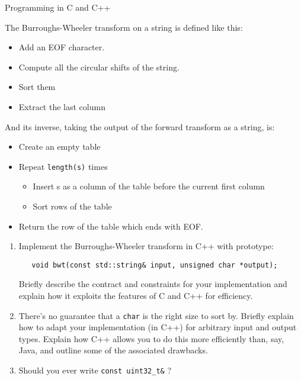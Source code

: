 \documentclass{tripos}
\begin{document}
\begin{question}[MockIB,year=2025,paper=2,question=6,author=rrw]{Programming in C and C++}

  The Burroughs-Wheeler transform on a string is defined like this:

  \begin{itemize}
    \item Add an EOF character.
    \item Compute all the circular shifts of the string.
    \item Sort them
    \item Extract the last column
  \end{itemize}

  And its inverse, taking the output of the forward transform as a string, is:

  \begin{itemize}
  \item Create an empty table
  \item Repeat \verb|length(s)| times
    \begin{itemize}
    \item Insert s as a column of the table before the current first column
    \item Sort rows of the table
    \end{itemize}
  \item Return the row of the table which ends with EOF.
  \end{itemize}

  \begin{enumerate}
  \item Implement the Burroughs-Wheeler transform in C++ with prototype:
\begin{verbatim}
   void bwt(const std::string& input, unsigned char *output);
\end{verbatim}
Briefly describe the contract and constraints for your implementation and explain how it exploits the features of C and C++ for efficiency.
\item There's no guarantee that a \verb|char| is the right size to sort by. Briefly explain how to adapt your implementation (in C++) for arbitrary input and output types. Explain how C++ allows you to do this more efficiently than, say, Java, and outline some of the associated drawbacks. 
\item Should you ever write \verb|const uint32_t&| ? 
\end{enumerate}
\end{question}
\eject
\end{document}
